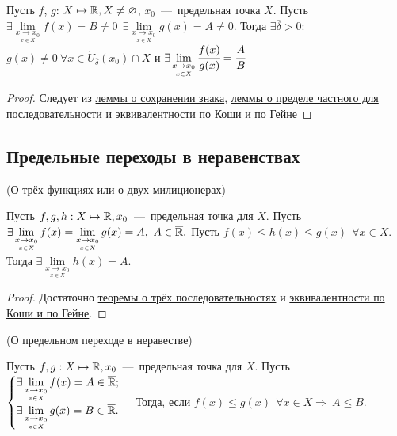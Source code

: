\begin{corollary}
    Пусть $f$, $g$: $X\mapsto \mathbb{R}, X\neq \varnothing$, $x_{0}$~---~предельная точка $X$. Пусть $\exists \lim\limits_{\underset{x \in X}{x\to x_0}} f(x) = B\neq 0 \ \ \exists \lim\limits_{\underset{x \in X}{x\to x_0}} g(x) = A\neq 0.$ Тогда $\exists \overline{\delta} > 0$: $g(x) \neq 0\ \forall x\in \mathring{U}_{\overline{\delta}}(x_{0}) \cap X$ и $\exists \lim\limits_{\underset{x \in X}{x\to x_0}} \cfrac{f(x)}{g(x)} = \cfrac{A}{B}$
\end{corollary}

\begin{proof}
        Следует из \hyperlink{lemm4.4}{леммы о сохранении знака}, \hyperlink{corollemm2.6}{леммы о пределе частного для последовательности} и \hyperlink{thm4.3}{эквивалентности по Коши и по Гейне}
\end{proof}

\subsection{Предельные переходы в неравенствах}
\begin{theorem}
    \hypertarget{thm4.7}{(О трёх функциях или о двух милиционерах)} Пусть $f, g, h: X \mapsto \mathbb{R}, x_{0}$~---~предельная точка для $X$. Пусть $\exists \lim\limits_{\underset{x \in X}{x\to x_0}} f(x) = \lim\limits_{\underset{x \in X}{x\to x_0}} g(x) = A, \ A \in \overline{\mathbb{R}}.$ Пусть $f(x) \leq h(x) \leq g(x) \ \ \forall x\in X.$ Тогда $\exists \lim\limits_{\underset{x \in X}{x\to x_0}} h(x) = A.$
\end{theorem}

\begin{proof}
    Достаточно \hyperlink{thm2.4}{теоремы о трёх последовательностях} и \hyperlink{thm4.3}{эквивалентности по Коши и по Гейне}.
\end{proof}

\begin{theorem}
    \hypertarget{thm4.8}{(О предельном переходе в неравестве)} Пусть $f, g: X \mapsto \mathbb{R}, x_{0}$~---~предельная точка для $X$.
    Пусть $ \begin{cases}   
        \exists \lim\limits_{\underset{x \in X}{x\to x_0}} f(x) = A \in \overline{\mathbb{R}};\\
        \exists \lim\limits_{\underset{x \in X}{x\to x_0}} g(x) = B \in \overline{\mathbb{R}}.
    \end{cases}$
    Тогда, если $ f(x) \leq g(x) \ \ \forall x\in X \Rightarrow \ A \leq B.$
\end{theorem}

